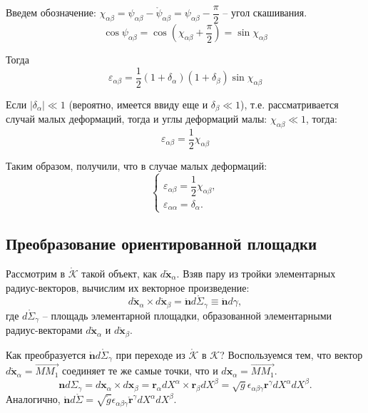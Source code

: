 Введем обозначение: $\chi_{\alpha\beta} = \psi_{\alpha\beta} - \mathring{\psi}_{\alpha\beta}
= \psi_{\alpha\beta} - \dfrac{\pi}{2}$ -- угол скашивания.
\[
  \cos\psi_{\alpha\beta} = \cos\left(\chi_{\alpha\beta} + \dfrac{\pi}{2}\right)
  = \sin\chi_{\alpha\beta}
\]

Тогда
\[
  \varepsilon_{\alpha\beta} = \dfrac{1}{2} (1+\delta_\alpha)(1+\delta_\beta) \sin\chi_{\alpha\beta}
\]

Если $|\delta_\alpha| \ll 1$ (вероятно, имеется ввиду еще и $\delta_\beta \ll 1$), т.е.
рассматривается случай малых деформаций, тогда и углы деформаций малы: $\chi_{\alpha\beta} \ll 1$,
тогда:
\[
  \varepsilon_{\alpha\beta} = \dfrac{1}{2} \chi_{\alpha\beta}
\]

\begin{example}
\end{example}

Таким образом, получили, что в случае малых деформаций:
\[
  \begin{cases}
    \varepsilon_{\alpha\beta} = \dfrac{1}{2} \chi_{\alpha\beta}, \\
    \varepsilon_{\alpha\alpha} = \delta_\alpha.
  \end{cases}
\]

\subsection{Преобразование ориентированной площадки}

Рассмотрим в $\mathring{\mathcal{K}}$ такой объект, как $d\mathring{\mathbf{x}}_\alpha$.
Взяв пару из тройки элементарных радиус-векторов, вычислим их векторное произведение:
\[
  d\mathring{\mathbf{x}}_\alpha \times d\mathring{\mathbf{x}}_\beta
  = \mathring{\mathbf{n}} d\mathring{\Sigma}_\gamma
  \equiv \mathring{\mathbf{n}} d\gamma,
\]
где $d\mathring{\Sigma}_\gamma$ -- площадь элементарной площадки, образованной элементарными
радиус-векторами $d\mathring{\mathbf{x}}_\alpha$ и $d\mathring{\mathbf{x}}_\beta$.

Как преобразуется $\mathring{\mathbf{n}} d\mathring{\Sigma}_\gamma$ при переходе из
$\mathcal{\mathring{K}}$ в $\mathcal{K}$?
Воспользуемся тем, что вектор $d\mathring{\mathbf{x}}_\alpha = \vec{MM_1}$ соединяет те же самые
точки, что и $d\mathbf{x}_\alpha = \vec{MM_1}$.
\[
  \mathbf{n} d\Sigma_\gamma = d\mathbf{x}_\alpha \times d\mathbf{x}_\beta
  = \mathbf{r}_\alpha dX^\alpha \times \mathbf{r}_\beta dX^\beta
  = \sqrt{g} \epsilon_{\alpha\beta\gamma} \mathbf{r}^\gamma dX^\alpha dX^\beta.
\]
Аналогично, $\mathring{\mathbf{n}} d\mathring{\Sigma} = \sqrt{\mathring{g}} \epsilon_{\alpha\beta\gamma} \mathring{\mathbf{r}}^\gamma dX^\alpha dX^\beta$.

